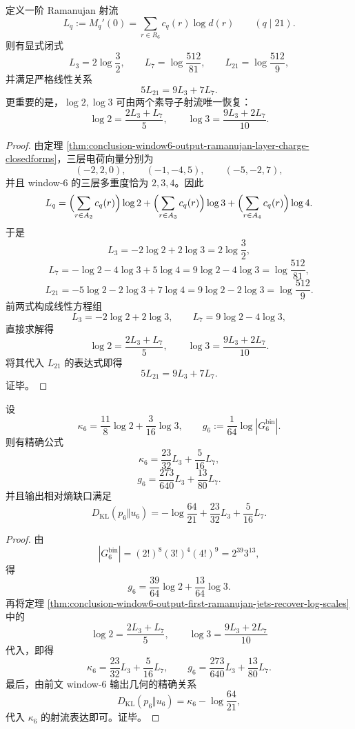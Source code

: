 \begin{theorem}\label{thm:conclusion-window6-output-first-ramanujan-jets-recover-log-scales}
定义一阶 Ramanujan 射流
\[
L_q:=M_q'(0)=\sum_{r\in R_6}c_q(r)\log d(r)
\qquad (q\mid 21).
\]
则有显式闭式
\[
L_3=2\log\frac32,
\qquad
L_7=\log\frac{512}{81},
\qquad
L_{21}=\log\frac{512}{9},
\]
并满足严格线性关系
\[
5L_{21}=9L_3+7L_7.
\]
更重要的是，\(\log 2,\log 3\) 可由两个素导子射流唯一恢复：
\[
\log 2=\frac{2L_3+L_7}{5},
\qquad
\log 3=\frac{9L_3+2L_7}{10}.
\]
\end{theorem}
\begin{proof}
由定理 \ref{thm:conclusion-window6-output-ramanujan-layer-charge-closedforms}，三层电荷向量分别为
\[
(-2,2,0),\qquad (-1,-4,5),\qquad (-5,-2,7),
\]
并且 window-\(6\) 的三层多重度恰为 \(2,3,4\)。因此
\[
L_q
=
\Bigl(\sum_{r\in A_2}c_q(r)\Bigr)\log 2
+
\Bigl(\sum_{r\in A_3}c_q(r)\Bigr)\log 3
+
\Bigl(\sum_{r\in A_4}c_q(r)\Bigr)\log 4.
\]
于是
\[
L_3=-2\log 2+2\log 3=2\log\frac32,
\]
\[
L_7=-\log 2-4\log 3+5\log 4
=9\log 2-4\log 3
=\log\frac{512}{81},
\]
\[
L_{21}=-5\log 2-2\log 3+7\log 4
=9\log 2-2\log 3
=\log\frac{512}{9}.
\]
前两式构成线性方程组
\[
L_3=-2\log 2+2\log 3,
\qquad
L_7=9\log 2-4\log 3,
\]
直接求解得
\[
\log 2=\frac{2L_3+L_7}{5},
\qquad
\log 3=\frac{9L_3+2L_7}{10}.
\]
将其代入 \(L_{21}\) 的表达式即得
\[
5L_{21}=9L_3+7L_7.
\]
证毕。
\end{proof}

\begin{corollary}\label{cor:conclusion-window6-output-entropy-gauge-density-linear-in-jets}
设
\[
\kappa_6=\frac{11}{8}\log 2+\frac{3}{16}\log 3,
\qquad
g_6:=\frac{1}{64}\log |G_6^{\mathrm{bin}}|.
\]
则有精确公式
\[
\kappa_6=\frac{23}{32}L_3+\frac{5}{16}L_7,
\]
\[
g_6=\frac{273}{640}L_3+\frac{13}{80}L_7.
\]
并且输出相对熵缺口满足
\[
D_{\mathrm{KL}}(p_6\Vert u_6)
=
-\log\frac{64}{21}
+\frac{23}{32}L_3+\frac{5}{16}L_7.
\]
\end{corollary}
\begin{proof}
由
\[
|G_6^{\mathrm{bin}}|=(2!)^8(3!)^4(4!)^9=2^{39}3^{13},
\]
得
\[
g_6=\frac{39}{64}\log 2+\frac{13}{64}\log 3.
\]
再将定理 \ref{thm:conclusion-window6-output-first-ramanujan-jets-recover-log-scales} 中的
\[
\log 2=\frac{2L_3+L_7}{5},
\qquad
\log 3=\frac{9L_3+2L_7}{10}
\]
代入，即得
\[
\kappa_6=\frac{23}{32}L_3+\frac{5}{16}L_7,
\qquad
g_6=\frac{273}{640}L_3+\frac{13}{80}L_7.
\]
最后，由前文 window-\(6\) 输出几何的精确关系
\[
D_{\mathrm{KL}}(p_6\Vert u_6)=\kappa_6-\log\frac{64}{21},
\]
代入 \(\kappa_6\) 的射流表达即可。证毕。
\end{proof}

